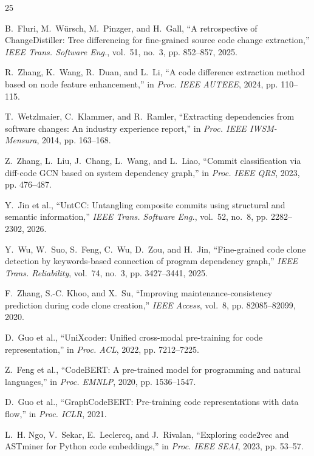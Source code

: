 \documentclass[conference]{IEEEtran}
\begin{document}
\begin{thebibliography}{25}

B.~Fluri, M.~W{\"u}rsch, M.~Pinzger, and H.~Gall, ``A retrospective of ChangeDistiller: Tree differencing for fine-grained source code change extraction,'' \emph{IEEE Trans. Software Eng.}, vol.~51, no.~3, pp. 852--857, 2025.

R.~Zhang, K.~Wang, R.~Duan, and L.~Li, ``A code difference extraction method based on node feature enhancement,'' in \emph{Proc. IEEE AUTEEE}, 2024, pp. 110--115.

T.~Wetzlmaier, C.~Klammer, and R.~Ramler, ``Extracting dependencies from software changes: An industry experience report,'' in \emph{Proc. IEEE IWSM-Mensura}, 2014, pp. 163--168.

Z.~Zhang, L.~Liu, J.~Chang, L.~Wang, and L.~Liao, ``Commit classification via diff-code GCN based on system dependency graph,'' in \emph{Proc. IEEE QRS}, 2023, pp. 476--487.

Y.~Jin et al., ``UntCC: Untangling composite commits using structural and semantic information,'' \emph{IEEE Trans. Software Eng.}, vol.~52, no.~8, pp. 2282--2302, 2026.

Y.~Wu, W.~Suo, S.~Feng, C.~Wu, D.~Zou, and H.~Jin, ``Fine-grained code clone detection by keywords-based connection of program dependency graph,'' \emph{IEEE Trans. Reliability}, vol.~74, no.~3, pp. 3427--3441, 2025.

F.~Zhang, S.-C. Khoo, and X.~Su, ``Improving maintenance-consistency prediction during code clone creation,'' \emph{IEEE Access}, vol.~8, pp. 82085--82099, 2020.

D.~Guo et al., ``UniXcoder: Unified cross-modal pre-training for code representation,'' in \emph{Proc. ACL}, 2022, pp. 7212--7225.

Z.~Feng et al., ``CodeBERT: A pre-trained model for programming and natural languages,'' in \emph{Proc. EMNLP}, 2020, pp. 1536--1547.

D.~Guo et al., ``GraphCodeBERT: Pre-training code representations with data flow,'' in \emph{Proc. ICLR}, 2021.

L.~H. Ngo, V.~Sekar, E.~Leclercq, and J.~Rivalan, ``Exploring code2vec and ASTminer for Python code embeddings,'' in \emph{Proc. IEEE SEAI}, 2023, pp. 53--57.


\end{thebibliography}
\end{document}
